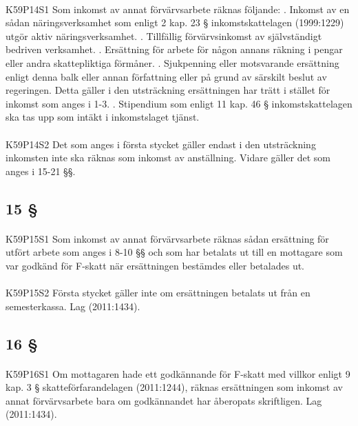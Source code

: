 \documentclass[a4paper,notitlepage,openany,10pt]{book}
\begin{document}
\paragraph*{}
{\tiny K59P14S1}
Som inkomst av annat förvärvsarbete räknas följande:
. Inkomst av en sådan näringsverksamhet som enligt 2 kap. 23 § inkomstskattelagen (1999:1229) utgör aktiv näringsverksamhet.
. Tillfällig förvärvsinkomst av självständigt bedriven verksamhet.
. Ersättning för arbete för någon annans räkning i pengar eller andra skattepliktiga förmåner.
. Sjukpenning eller motsvarande ersättning enligt denna balk eller annan författning eller på grund av särskilt beslut av regeringen. Detta gäller i den utsträckning ersättningen har trätt i stället för inkomst som anges i 1-3.
. Stipendium som enligt 11 kap. 46 § inkomstskattelagen ska tas upp som intäkt i inkomstslaget tjänst.
\paragraph*{}
{\tiny K59P14S2}
Det som anges i första stycket gäller endast i den utsträckning inkomsten inte ska räknas som inkomst av anställning. Vidare gäller det som anges i 15-21 §§.
\subsection*{15 §}
\paragraph*{}
{\tiny K59P15S1}
Som inkomst av annat förvärvsarbete räknas sådan ersättning för utfört arbete som anges i 8-10 §§ och som har betalats ut till en mottagare som var godkänd för F-skatt när ersättningen bestämdes eller betalades ut.
\paragraph*{}
{\tiny K59P15S2}
Första stycket gäller inte om ersättningen betalats ut från en semesterkassa.
Lag (2011:1434).
\subsection*{16 §}
\paragraph*{}
{\tiny K59P16S1}
Om mottagaren hade ett godkännande för F-skatt med villkor enligt 9 kap. 3 § skatteförfarandelagen (2011:1244), räknas ersättningen som inkomst av annat förvärvsarbete bara om godkännandet har åberopats skriftligen.
Lag (2011:1434).
\end{document}
